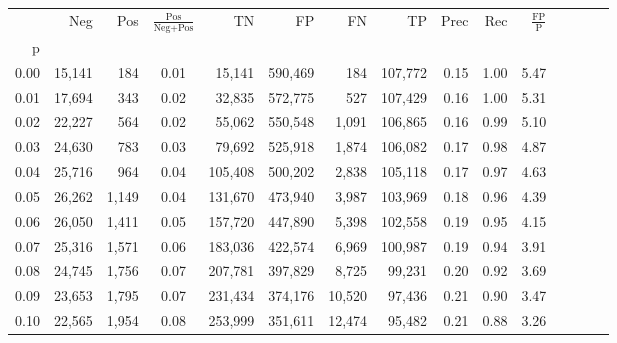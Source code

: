 \begin{tabular}{rrrcrrrrrrrrrrr}
\toprule
{} &     Neg &    Pos & $\frac{\text{Pos}}{\text{Neg}+\text{Pos}}$ &       TN &       FP &       FN &       TP &  Prec &   Rec & $\frac{\text{FP}}{\text{P}}$ \\
p    &         &        &                                            &          &          &          &          &       &       &                              \\
\midrule
0.00 &  15,141 &    184 &                                       0.01 &   15,141 &  590,469 &      184 &  107,772 &  0.15 &  1.00 &                         5.47 \\
0.01 &  17,694 &    343 &                                       0.02 &   32,835 &  572,775 &      527 &  107,429 &  0.16 &  1.00 &                         5.31 \\
0.02 &  22,227 &    564 &                                       0.02 &   55,062 &  550,548 &    1,091 &  106,865 &  0.16 &  0.99 &                         5.10 \\
0.03 &  24,630 &    783 &                                       0.03 &   79,692 &  525,918 &    1,874 &  106,082 &  0.17 &  0.98 &                         4.87 \\
0.04 &  25,716 &    964 &                                       0.04 &  105,408 &  500,202 &    2,838 &  105,118 &  0.17 &  0.97 &                         4.63 \\
0.05 &  26,262 &  1,149 &                                       0.04 &  131,670 &  473,940 &    3,987 &  103,969 &  0.18 &  0.96 &                         4.39 \\
0.06 &  26,050 &  1,411 &                                       0.05 &  157,720 &  447,890 &    5,398 &  102,558 &  0.19 &  0.95 &                         4.15 \\
0.07 &  25,316 &  1,571 &                                       0.06 &  183,036 &  422,574 &    6,969 &  100,987 &  0.19 &  0.94 &                         3.91 \\
0.08 &  24,745 &  1,756 &                                       0.07 &  207,781 &  397,829 &    8,725 &   99,231 &  0.20 &  0.92 &                         3.69 \\
0.09 &  23,653 &  1,795 &                                       0.07 &  231,434 &  374,176 &   10,520 &   97,436 &  0.21 &  0.90 &                         3.47 \\
0.10 &  22,565 &  1,954 &                                       0.08 &  253,999 &  351,611 &   12,474 &   95,482 &  0.21 &  0.88 &                         3.26 \\

\end{tabular}
